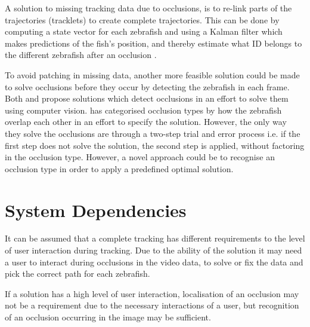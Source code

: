A solution to missing tracking data due to occlusions, is to re-link parts of the trajectories (tracklets) to create complete trajectories. This can be done by computing a state vector for each zebrafish and using a Kalman filter which makes predictions of the fish’s position, and thereby estimate what ID belongs to the different zebrafish after an occlusion \citep{Feijo2018, Qian2014}.

To avoid patching in missing data, another more feasible solution could be made to solve occlusions before they occur by detecting the zebrafish in each frame. Both \cite{Romero-Ferrero2019} and \cite{Dolado2014} propose solutions which detect occlusions in an effort to solve them using computer vision. \cite{Dolado2014} has categorised occlusion types by how the zebrafish overlap each other in an effort to specify the solution. However, the only way they solve the occlusions are through a two-step trial and error process i.e. if the first step does not solve the solution, the second step is applied, without factoring in the occlusion type. 
However, a novel approach could be to recognise an occlusion type in order to apply a predefined optimal solution.


\section{System Dependencies}\label{sec:int_dep}
It can be assumed that a complete tracking has different requirements to the level of user interaction during tracking. Due to the ability of the solution it may need a user to interact during occlusions in the video data, to solve or fix the data and pick the correct path for each zebrafish.

If a solution has a high level of user interaction, localisation of an occlusion may not be a requirement due to the necessary interactions of a user, but recognition of an occlusion occurring in the image may be sufficient.\\

